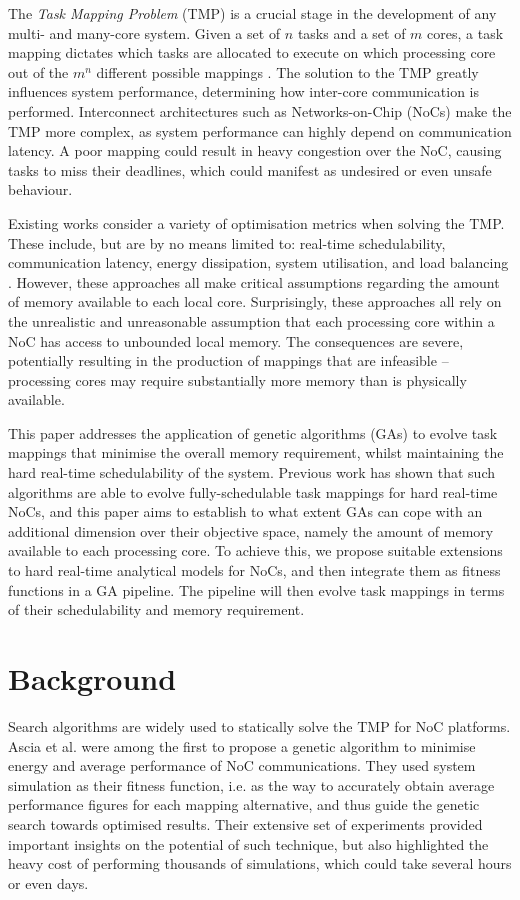 \documentclass[10pt,conference]{IEEEtran}
\begin{document}
The \textit{Task Mapping Problem} (TMP) is a crucial stage in the development of any multi- and many-core system. Given a set of $n$ tasks and a set of $m$ cores, a task mapping dictates which tasks are allocated to execute on which processing core out of the $m^n$ different possible mappings \cite{Tindell92}. The solution to the TMP greatly influences system performance, determining how inter-core communication is performed. Interconnect architectures such as Networks-on-Chip (NoCs) make the TMP more complex, as system performance can highly depend on communication latency. A poor mapping could result in heavy congestion over the NoC, causing tasks to miss their deadlines, which could manifest as undesired or even unsafe behaviour.

Existing works consider a variety of optimisation metrics when solving the TMP. These include, but are by no means limited to: real-time schedulability, communication latency, energy dissipation, system utilisation, and load balancing \cite{Singh13}. However, these approaches all make critical assumptions regarding the amount of memory available to each local core. Surprisingly, these approaches all rely on the unrealistic and unreasonable assumption that each processing core within a NoC has access to unbounded local memory. The consequences are severe, potentially resulting in the production of mappings that are infeasible -- processing cores may require substantially more memory than is physically available.

This paper addresses the application of genetic algorithms (GAs) to evolve task mappings that minimise the overall memory requirement, whilst maintaining the hard real-time schedulability of the system. Previous work has shown that such algorithms are able to evolve fully-schedulable task mappings for hard real-time NoCs, and this paper aims to establish to what extent GAs can cope with an additional dimension over their objective space, namely the amount of memory available to each processing core. To achieve this, we propose suitable extensions to hard real-time analytical models for NoCs, and then integrate them as fitness functions in a GA pipeline. The pipeline will then evolve task mappings in terms of their schedulability and memory requirement.

\section{Background}\label{sec:background}

Search algorithms are widely used to statically solve the TMP for NoC platforms. Ascia et al.\cite{Ascia04} were among the first to propose a genetic algorithm to minimise energy and average performance of NoC communications. They used system simulation as their fitness function, i.e. as the way to accurately obtain average performance figures for each mapping alternative, and thus guide the genetic search towards optimised results. Their extensive set of experiments provided important insights on the potential of such technique, but also highlighted the heavy cost of performing thousands of simulations, which could take several hours or even days.
\end{document}
